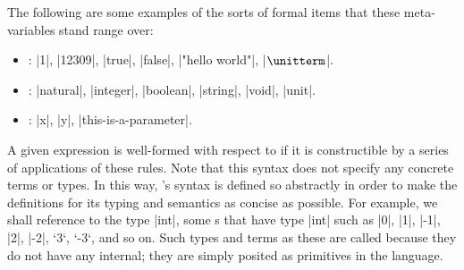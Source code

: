 The following are some examples of the sorts of formal items that these meta-variables stand range over:
\begin{itemize}
  \item {}:
    \code|1|,
    \code|12309|,
    \code|true|,
    \code|false|,
    \code|"hello world"|,
    \code|$\unitterm$|.
  \item {}:
    \code|natural|,
    \code|integer|,
    \code|boolean|,
    \code|string|,
    \code|void|,
    \code|unit|.
  \item {}:
    \code|x|,
    \code|y|,
    \code|this-is-a-parameter|.
\end{itemize}

A given expression is well-formed with respect to \LangA if it is constructible by a series of applications of these rules.
Note that this syntax does not specify any concrete terms or types.
In this way, \LangA's syntax is defined so abstractly in order to make the definitions for its typing and semantics as concise as possible.
For example, we shall reference to the type \code|int|, some s that have type \code|int| such as
\code|0|, \code|1|, \code|-1|, \code|2|, \code|-2|, \code`3`, \code`-3`,
and so on.
Such types and terms as these are called  because they do not have any internal; they are simply posited as primitives in the language.

